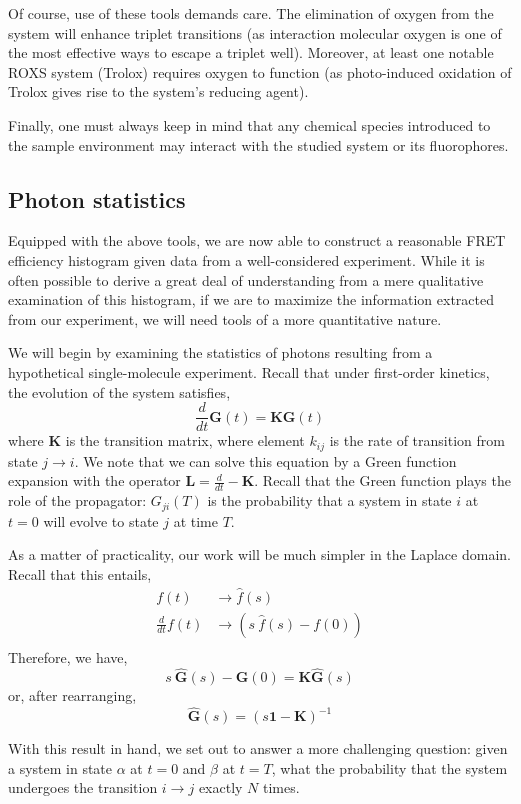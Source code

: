 \documentclass{article}
\begin{document}
Of course, use of these tools demands care. The elimination of oxygen
from the system will enhance triplet transitions (as interaction
molecular oxygen is one of the most effective ways to escape a triplet
well\cite{Campos2011}). Moreover, at least one notable ROXS system
(Trolox) requires oxygen to function (as photo-induced oxidation of
Trolox gives rise to the system's reducing agent\cite{Cordes2009}).

Finally, one must always keep in mind that any chemical species
introduced to the sample environment may interact with the studied
system or its fluorophores.

\subsection{Photon statistics}
Equipped with the above tools, we are now able to construct a
reasonable FRET efficiency histogram given data from a well-considered
experiment. While it is often possible to derive a great deal of
understanding from a mere qualitative examination of this histogram,
if we are to maximize the information extracted from our experiment,
we will need tools of a more quantitative nature.

We will begin by examining the statistics of photons resulting from a
hypothetical single-molecule experiment. Recall that under first-order
kinetics, the evolution of the system satisfies,
\[ \frac{d}{dt} \mathbf{G}(t) = \mathbf{K} \mathbf{G}(t) \]
where $\mathbf{K}$ is the transition matrix, where element $k_{ij}$ is
the rate of transition from state $j \rightarrow i$. We note that we
can solve this equation by a Green function expansion with the
operator $\mathbf{L} = \frac{d}{dt} - \mathbf{K}$. Recall that the
Green function plays the role of the propagator: $G_{ji}(T)$ is the
probability that a system in state $i$ at $t=0$ will evolve to state
$j$ at time $T$.

As a matter of practicality, our work will be much simpler in the
Laplace domain. Recall that this entails,
\begin{align*}
f(t) & \rightarrow \hat f(s) \\
\frac{d}{dt} f(t) & \rightarrow (s~ \hat f(s) - f(0)) \\
\end{align*}
Therefore, we have,
\[ s~\mathbf{\hat G}(s) - \mathbf{G}(0) = \mathbf{K} \mathbf{\hat G}(s) \]
or, after rearranging,
\[ \mathbf{\hat G}(s) = (s \mathbf{1} - \mathbf{K})^{-1} \]

With this result in hand, we set out to answer a more challenging
question: given a system in state $\alpha$ at $t=0$ and $\beta$ at
$t=T$, what the probability that the system undergoes the transition
$i \rightarrow j$ exactly $N$ times.
\end{document}
